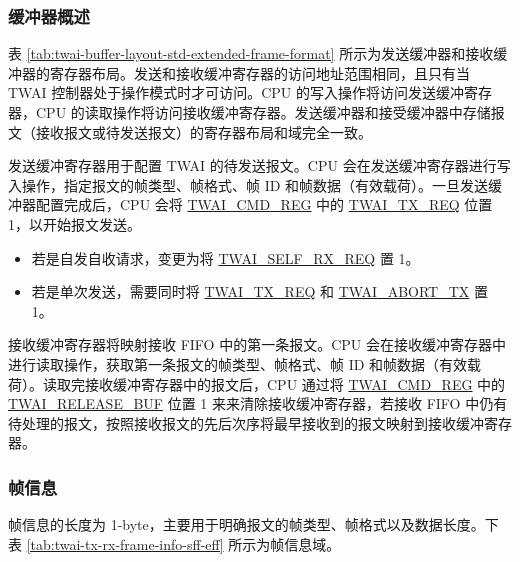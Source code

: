 \documentclass[main\_\_CN.tex]{subfiles}
\begin{document}
\subsubsection{缓冲器概述}



表 \ref{tab:twai-buffer-layout-std-extended-frame-format} 所示为发送缓冲器和接收缓冲器的寄存器布局。发送和接收缓冲寄存器的访问地址范围相同，且只有当 TWAI 控制器处于操作模式时才可访问。CPU 的写入操作将访问发送缓冲寄存器，CPU 的读取操作将访问接收缓冲寄存器。发送缓冲器和接受缓冲器中存储报文（接收报文或待发送报文）的寄存器布局和域完全一致。

发送缓冲寄存器用于配置 TWAI 的待发送报文。CPU 会在发送缓冲寄存器进行写入操作，指定报文的帧类型、帧格式、帧 ID 和帧数据（有效载荷）。一旦发送缓冲器配置完成后，CPU 会将 \hyperref[regdesc:TWAICMDREG]{TWAI\_CMD\_REG} 中的 \hyperref[fielddesc:TWAITXREQ]{TWAI\_TX\_REQ} 位置 1，以开始报文发送。

\begin{itemize}
    \item 若是自发自收请求，变更为将 \hyperref[fielddesc:TWAISELFRXREQ]{TWAI\_SELF\_RX\_REQ} 置 1。
    \item 若是单次发送，需要同时将 \hyperref[fielddesc:TWAITXREQ]{TWAI\_TX\_REQ} 和 \hyperref[fielddesc:TWAIABORTTX]{TWAI\_ABORT\_TX} 置 1。
\end{itemize}

接收缓冲寄存器将映射接收 FIFO 中的第一条报文。CPU 会在接收缓冲寄存器中进行读取操作，获取第一条报文的帧类型、帧格式、帧 ID 和帧数据（有效载荷）。读取完接收缓冲寄存器中的报文后，CPU 通过将 \hyperref[regdesc:TWAICMDREG]{TWAI\_CMD\_REG} 中的 \hyperref[fielddesc:TWAIRELEASEBUF]{TWAI\_RELEASE\_BUF} 位置 1 来来清除接收缓冲寄存器，若接收 FIFO 中仍有待处理的报文，按照接收报文的先后次序将最早接收到的报文映射到接收缓冲寄存器。

\subsubsection{帧信息}
帧信息的长度为 1-byte，主要用于明确报文的帧类型、帧格式以及数据长度。下表 \ref{tab:twai-tx-rx-frame-info-sff-eff} 所示为帧信息域。
\end{document}
